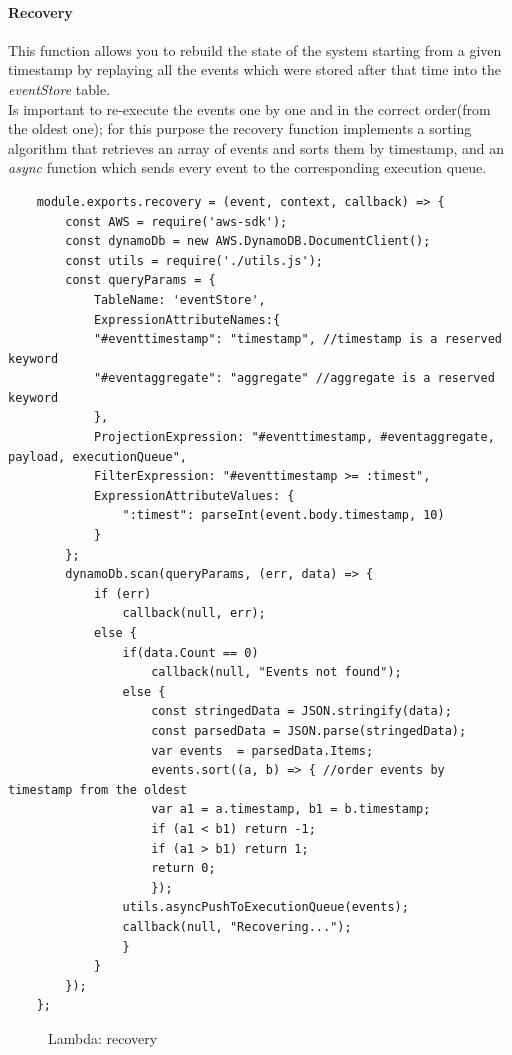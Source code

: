 \paragraph{Recovery} \Spazio
This function allows you to rebuild the state of the system starting from a given timestamp by replaying all the events which were stored after that time into the \emph{eventStore} table.\\
Is important to re-execute the events one by one and in the correct order(from the oldest one); for this purpose the recovery function implements a sorting algorithm that retrieves an array of events and sorts them by timestamp, and an \emph{async} function which sends every event to the corresponding execution queue.
\begin{lstlisting}
	module.exports.recovery = (event, context, callback) => { 
		const AWS = require('aws-sdk');
		const dynamoDb = new AWS.DynamoDB.DocumentClient();
		const utils = require('./utils.js');
		const queryParams = { 
			TableName: 'eventStore',
			ExpressionAttributeNames:{
			"#eventtimestamp": "timestamp", //timestamp is a reserved keyword
			"#eventaggregate": "aggregate" //aggregate is a reserved keyword 
			},
			ProjectionExpression: "#eventtimestamp, #eventaggregate, payload, executionQueue",
			FilterExpression: "#eventtimestamp >= :timest",
			ExpressionAttributeValues: {
				":timest": parseInt(event.body.timestamp, 10)
			}
		};
		dynamoDb.scan(queryParams, (err, data) => {
			if (err)
				callback(null, err);
			else {
				if(data.Count == 0)
					callback(null, "Events not found");
				else {
					const stringedData = JSON.stringify(data);
					const parsedData = JSON.parse(stringedData);
					var events  = parsedData.Items;
					events.sort((a, b) => { //order events by timestamp from the oldest
					var a1 = a.timestamp, b1 = b.timestamp;
					if (a1 < b1) return -1;
					if (a1 > b1) return 1;
					return 0;
					});
				utils.asyncPushToExecutionQueue(events);
				callback(null, "Recovering...");
				}
			} 
		});
	};
\end{lstlisting}
\begin{figure} [H]
	\caption{Lambda: recovery}
\end{figure}

